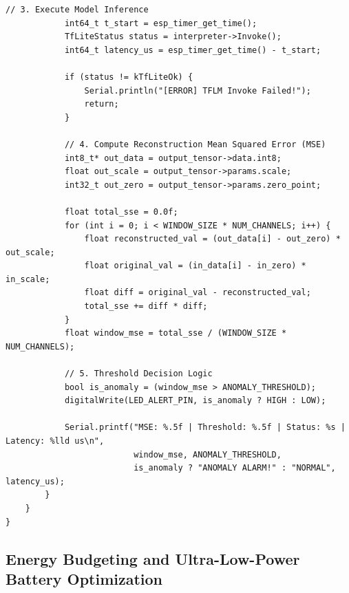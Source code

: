 \begin{lstlisting}[style=pythonstyle, caption={Production ESP32 C++ Anomaly Detection Firmware with TFLM.}, label={lst:esp32_firmware}]
            // 3. Execute Model Inference
            int64_t t_start = esp_timer_get_time();
            TfLiteStatus status = interpreter->Invoke();
            int64_t latency_us = esp_timer_get_time() - t_start;

            if (status != kTfLiteOk) {
                Serial.println("[ERROR] TFLM Invoke Failed!");
                return;
            }

            // 4. Compute Reconstruction Mean Squared Error (MSE)
            int8_t* out_data = output_tensor->data.int8;
            float out_scale = output_tensor->params.scale;
            int32_t out_zero = output_tensor->params.zero_point;

            float total_sse = 0.0f;
            for (int i = 0; i < WINDOW_SIZE * NUM_CHANNELS; i++) {
                float reconstructed_val = (out_data[i] - out_zero) * out_scale;
                float original_val = (in_data[i] - in_zero) * in_scale;
                float diff = original_val - reconstructed_val;
                total_sse += diff * diff;
            }
            float window_mse = total_sse / (WINDOW_SIZE * NUM_CHANNELS);

            // 5. Threshold Decision Logic
            bool is_anomaly = (window_mse > ANOMALY_THRESHOLD);
            digitalWrite(LED_ALERT_PIN, is_anomaly ? HIGH : LOW);

            Serial.printf("MSE: %.5f | Threshold: %.5f | Status: %s | Latency: %lld us\n",
                          window_mse, ANOMALY_THRESHOLD,
                          is_anomaly ? "ANOMALY ALARM!" : "NORMAL", latency_us);
        }
    }
}
\end{lstlisting}

\subsection{Energy Budgeting and Ultra-Low-Power Battery Optimization}\label{subsec:p3_energy}

